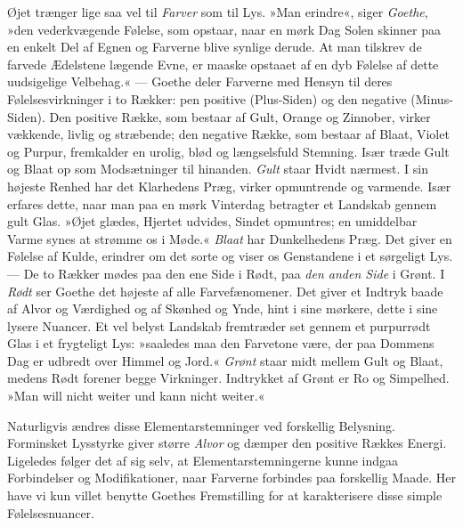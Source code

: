 \documentclass[12pt,a4paper,openany]{book}
\newcommand{\opage}[1]{\marginnote{\footnotesize\textit{[#1]}}}
\begin{document}
Øjet trænger lige saa vel til \emph{Farver} som til Lys. »Man erindre«,
siger \emph{Goethe}, »den vederkvægende Følelse, som opstaar, naar en
mørk Dag Solen skinner paa en enkelt Del af Egnen og Farverne blive
synlige derude. At man tilskrev de farvede Ædelstene lægende Evne, er
maaske opstaaet af en dyb Følelse af dette uudsigelige Velbehag.« ---
Goethe deler Farverne med Hensyn til deres Følelsesvirkninger i to
Rækker: pen positive (Plus-Siden) og den negative (Minus-Siden). Den
positive Række, som bestaar af Gult, Orange og Zinnober, virker
vækkende, livlig og stræbende; den negative Række, som bestaar af Blaat,
Violet og Purpur, fremkalder en urolig, blød og længselsfuld Stemning.
Især træde Gult og Blaat op som Modsætninger til hinanden. \emph{Gult}
staar Hvidt nærmest. I sin højeste Renhed har det Klarhedens Præg,
virker opmuntrende og varmende. Især erfares dette, naar man paa en mørk
Vinterdag betragter et Landskab gennem gult Glas. »Øjet glædes, Hjertet
udvides, Sindet opmuntres; en umiddelbar Varme synes at strømme os i
Møde.« \emph{Blaat} har Dunkelhedens Præg. Det giver en Følelse af
Kulde, erindrer om det sorte og viser os Genstandene i et sørgeligt Lys.
--- De to Rækker mødes paa den ene Side i Rødt, paa \emph{den anden
Side} i Grønt. I \emph{Rødt} ser Goethe det højeste af alle
Farvefænomener. Det giver et Indtryk baade af Alvor og Værdighed og af
Skønhed og Ynde, hint i sine mørkere, dette i sine lysere Nuancer. Et
vel belyst Landskab fremtræder set gennem et purpurrødt Glas i et
frygteligt Lys: »saaledes maa den Farvetone være, der paa Dommens Dag er
udbredt over Himmel og Jord.« \emph{Grønt} staar midt mellem Gult og
Blaat, medens Rødt forener begge Virkninger. Indtrykket af Grønt er Ro
og Simpelhed. »Man will nicht weiter und kann nicht weiter.«

Naturligvis ændres disse Elementarstemninger ved forskellig Belysning.
Forminsket Lysstyrke giver større \emph{Alvor} og dæmper den positive
Rækkes Energi. Ligeledes følger det af
\opage{279}sig selv, at Elementarstemningerne kunne indgaa Forbindelser
og Modifikationer, naar Farverne forbindes paa forskellig Maade. Her
have vi kun villet benytte Goethes Fremstilling for at karakterisere
disse simple Følelsesnuancer.
\end{document}
